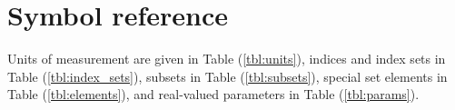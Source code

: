 \newcommand{\notationtable}[4] {
  {
    \tabulinesep=3pt
    \begin{center}
      \begin{longtabu} to \linewidth {lX[L]}

        \caption[
        ]{
          #3 %
          #4 %
        } \\
        \toprule
        #2 %
        \midrule
        \endfirsthead

        \caption{Continued} \\
        \toprule
        #2 %
        \midrule
        \endhead

        \bottomrule
        \endfoot

        \bottomrule
        \endlastfoot
        
        #1 %
      \end{longtabu}
    \end{center}
  }
}

\chapter{Symbol reference}\label{chap:symbref}

Units of measurement are given in Table (\ref{tbl:units}),
indices and index sets in Table (\ref{tbl:index_sets}),
subsets in Table (\ref{tbl:subsets}),
special set elements in Table (\ref{tbl:elements}), and
real-valued parameters in Table (\ref{tbl:params}).

